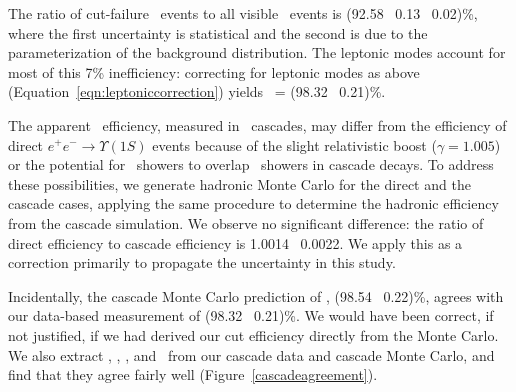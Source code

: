 \documentclass{cornell}
\begin{document}
The ratio of cut-failure \us\ events to all visible \us\ events is
(92.58 \PM\ 0.13 \PM\ 0.02)\%, where the first uncertainty is
statistical and the second is due to the parameterization of the
background distribution.  The leptonic modes account for most of this
7\% inefficiency: correcting for leptonic modes as above
(Equation~\ref{eqn:leptoniccorrection}) yields \ecuts\ = (98.32 \PM\
0.21)\%.

The apparent \us\ efficiency, measured in \twotoone\ cascades, may
differ from the efficiency of direct $e^+e^- \to \Upsilon(1S)$ events
because of the slight relativistic boost ($\gamma = 1.005$) or the
potential for \pipi\ showers to overlap \us\ showers in cascade
decays.  To address these possibilities, we generate hadronic Monte
Carlo for the direct and the cascade cases, applying the same
procedure to determine the hadronic efficiency from the cascade
simulation.  We observe no significant difference: the ratio of direct
efficiency to cascade efficiency is 1.0014 \PM\ 0.0022.  We apply this
as a correction primarily to propagate the uncertainty in this study.

Incidentally, the cascade Monte Carlo prediction of \ecuts, (98.54
\PM\ 0.22)\%, agrees with our data-based measurement of (98.32 \PM\
0.21)\%.  We would have been correct, if not justified, if we had
derived our cut efficiency directly from the Monte Carlo.  We also
extract \pmax, \visen, \dxy, and \dz\ from our cascade data and
cascade Monte Carlo, and find that they agree fairly well (Figure~\ref{cascadeagreement}).
\end{document}
